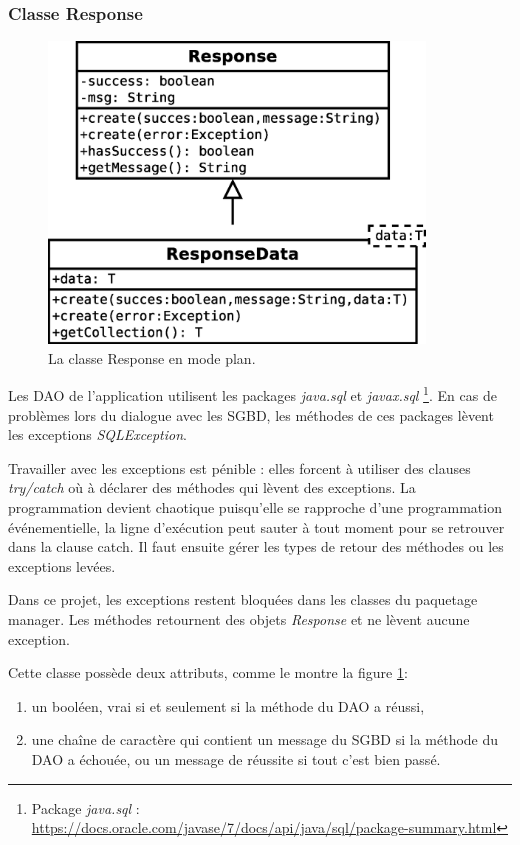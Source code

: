\subsubsection{Classe Response}
\begin{figure}[!h]
  \centering
  \includegraphics[width=10cm]{images/response.eps}
  \caption{La classe Response en mode plan.}
  \label{uml_classe_response}
\end{figure}

Les DAO de l'application utilisent les packages \textit{java.sql} et \textit{javax.sql}
\footnote{\label{paquetages_sql}Package \textit{java.sql} : \url{https://docs.oracle.com/javase/7/docs/api/java/sql/package-summary.html}}.
En cas de problèmes lors du dialogue avec les SGBD, les méthodes de ces packages lèvent les exceptions \textit{SQLException}.

Travailler avec les exceptions est pénible : elles forcent à utiliser des clauses \textit{try/catch} où à déclarer des méthodes qui lèvent des exceptions.
La programmation devient chaotique puisqu'elle se rapproche d'une programmation événementielle, la ligne d'exécution peut sauter à tout moment pour se retrouver dans la clause catch.
Il faut ensuite gérer les types de retour des méthodes ou les exceptions levées.

Dans ce projet, les exceptions restent bloquées dans les classes du paquetage manager.
Les méthodes retournent des objets \textit{Response} et ne lèvent aucune exception.

Cette classe possède deux attributs, comme le montre la figure \ref{uml_classe_response}:
\begin{enumerate}
\item un booléen, vrai si et seulement si la méthode du DAO a réussi,
\item une chaîne de caractère qui contient un message du SGBD si la méthode du DAO a échouée, ou un message de réussite si tout c'est bien passé.
\end{enumerate}

